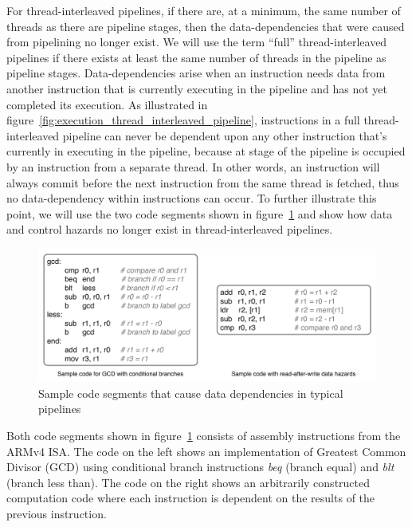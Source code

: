 For thread-interleaved pipelines, if there are, at a minimum, the same number of threads as there are pipeline stages, then the data-dependencies that were caused from pipelining no longer exist. 
We will use the term ``full'' thread-interleaved pipelines if there exists at least the same number of threads in the pipeline as pipeline stages.  
Data-dependencies arise when an instruction needs data from another instruction that is currently executing in the pipeline and has not yet completed its execution.
As illustrated in figure~\ref{fig:execution_thread_interleaved_pipeline}, instructions in a full thread-interleaved pipeline can never be dependent upon any other instruction that's currently in executing in the pipeline, because at stage of the pipeline is occupied by an instruction from a separate thread.
In other words, an instruction will always commit before the next instruction from the same thread is fetched, thus no data-dependency within instructions can occur. 
To further illustrate this point, we will use the two code segments shown in figure~\ref{fig:sample_code_for_pipeline_hazards} and show how data and control hazards no longer exist in thread-interleaved pipelines. 
\begin{figure}
  \begin{center}
    \includegraphics[scale=.6]{figs/sample_code_for_pipeline_hazards}
  \end{center}
  \vspace{-20pt}
  \caption{Sample code segments that cause data dependencies in typical pipelines}
  \label{fig:sample_code_for_pipeline_hazards}
\end{figure}
Both code segments shown in figure~\ref{fig:sample_code_for_pipeline_hazards} consists of assembly instructions from the ARMv4 ISA.
The code on the left shows an implementation of Greatest Common Divisor (GCD) using conditional branch instructions \emph{beq} (branch equal) and \emph{blt} (branch less than). 
The code on the right shows an arbitrarily constructed computation code where each instruction is dependent on the results of the previous instruction. 

